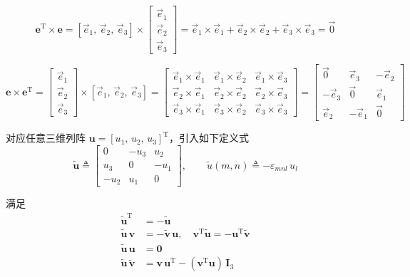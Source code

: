 \begin{equation}
\boldsymbol{e}^{\mathrm{T}} \times \boldsymbol{e} = [\vec{e}_1,\, \vec{e}_2,\, \vec{e}_3] \times \begin{bmatrix} \vec{e}_1 \\ \vec{e}_2 \\ \vec{e}_3 \end{bmatrix} = \vec{e}_1 \times \vec{e}_1 + \vec{e}_2 \times \vec{e}_2 + \vec{e}_3 \times \vec{e}_3 = \vec{0}
\end{equation}

\begin{equation}
\boldsymbol{e} \times \boldsymbol{e}^{\mathrm{T}} = \begin{bmatrix} \vec{e}_1 \\ \vec{e}_2 \\ \vec{e}_3 \end{bmatrix} \times [\vec{e}_1,\, \vec{e}_2,\, \vec{e}_3] = \begin{bmatrix} \vec{e}_1 \times \vec{e}_1 & \vec{e}_1 \times \vec{e}_2 & \vec{e}_1 \times \vec{e}_3 \\ \vec{e}_2 \times \vec{e}_1 & \vec{e}_2 \times \vec{e}_2 & \vec{e}_2 \times \vec{e}_3 \\ \vec{e}_3 \times \vec{e}_1 & \vec{e}_3 \times \vec{e}_2 & \vec{e}_3 \times \vec{e}_3 \end{bmatrix} = \begin{bmatrix} \vec{0} & \vec{e}_3 & -\vec{e}_2 \\ -\vec{e}_3 & \vec{0} & \vec{e}_1 \\ \vec{e}_2 & -\vec{e}_1 & \vec{0} \end{bmatrix}
\end{equation}

对应任意三维列阵 $\boldsymbol{u} = [u_1,\, u_2,\, u_3]^{\mathrm{T}}$，引入如下定义式
\begin{equation}\label{eq:4.skew_matrix}
\tilde{\boldsymbol{u}} \triangleq \begin{bmatrix} 0 & -u_3 & u_2 \\ u_3 & 0 & -u_1 \\ -u_2 & u_1 & 0 \end{bmatrix}, \qquad \tilde{u}(m, n) \triangleq -\varepsilon_{mnl}\, u_l
\end{equation}

满足
\begin{align}
\tilde{\boldsymbol{u}}^{\mathrm{T}} &= -\tilde{\boldsymbol{u}} \\
\tilde{\boldsymbol{u}}\, \boldsymbol{v} &= -\tilde{\boldsymbol{v}}\, \boldsymbol{u}, \quad \boldsymbol{v}^{\mathrm{T}} \tilde{\boldsymbol{u}} = -\boldsymbol{u}^{\mathrm{T}} \tilde{\boldsymbol{v}} \\
\tilde{\boldsymbol{u}}\, \boldsymbol{u} &= \boldsymbol{0} \\
\tilde{\boldsymbol{u}}\, \tilde{\boldsymbol{v}} &= \boldsymbol{v}\, \boldsymbol{u}^{\mathrm{T}} - (\boldsymbol{v}^{\mathrm{T}} \boldsymbol{u})\, \boldsymbol{I}_3
\end{align}

